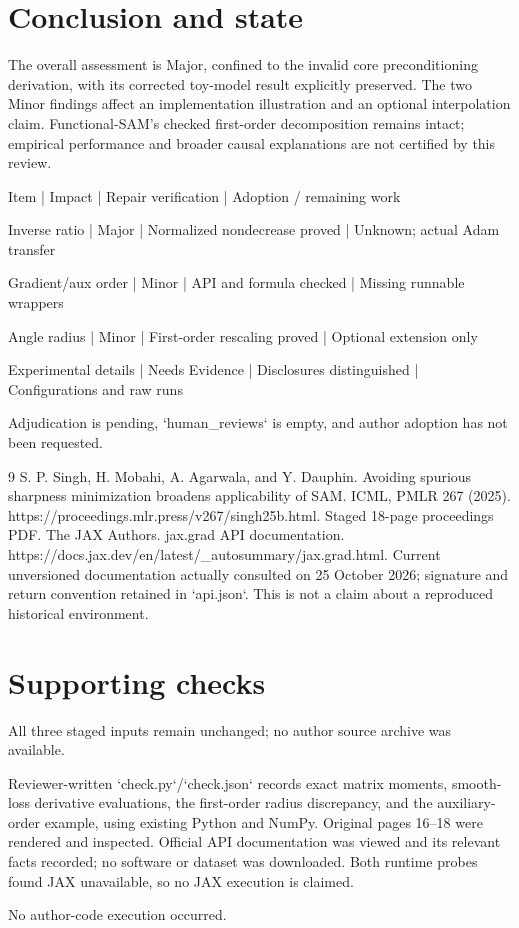 \documentclass[10pt]{article}
\begin{document}
\section*{Conclusion and state}
The overall assessment is Major, confined to the invalid core preconditioning derivation, with its corrected toy-model result explicitly preserved. The two Minor findings affect an implementation illustration and an optional interpolation claim. Functional-SAM’s checked first-order decomposition remains intact; empirical performance and broader causal explanations are not certified by this review.\par
Item | Impact | Repair verification | Adoption / remaining work\par
Inverse ratio | Major | Normalized nondecrease proved | Unknown; actual Adam transfer\par
Gradient/aux order | Minor | API and formula checked | Missing runnable wrappers\par
Angle radius | Minor | First-order rescaling proved | Optional extension only\par
Experimental details | Needs Evidence | Disclosures distinguished | Configurations and raw runs\par
Adjudication is pending, `human\_reviews` is empty, and author adoption has not been requested.\par
9 S. P. Singh, H. Mobahi, A. Agarwala, and Y. Dauphin. Avoiding spurious sharpness minimization broadens applicability of SAM. ICML, PMLR 267 (2025). https://proceedings.mlr.press/v267/singh25b.html. Staged 18-page proceedings PDF. The JAX Authors. jax.grad API documentation. https://docs.jax.dev/en/latest/\_autosummary/jax.grad.html. Current unversioned documentation actually consulted on 25 October 2026; signature and return convention retained in `api.json`. This is not a claim about a reproduced historical environment.\par
\section*{Supporting checks}
All three staged inputs remain unchanged; no author source archive was available.\par
Reviewer-written `check.py`/`check.json` records exact matrix moments, smooth-loss derivative evaluations, the first-order radius discrepancy, and the auxiliary-order example, using existing Python and NumPy. Original pages 16–18 were rendered and inspected. Official API documentation was viewed and its relevant facts recorded; no software or dataset was downloaded. Both runtime probes found JAX unavailable, so no JAX execution is claimed.\par
No author-code execution occurred.\par
\end{document}
